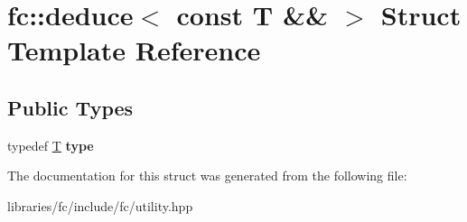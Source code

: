 \hypertarget{structfc_1_1deduce_3_01const_01_t_01_6_6_01_4}{}\section{fc\+:\+:deduce$<$ const T \&\& $>$ Struct Template Reference}
\label{structfc_1_1deduce_3_01const_01_t_01_6_6_01_4}
\subsection*{Public Types}
\begin{DoxyCompactItemize}
\item 
\mbox{\label{structfc_1_1deduce_3_01const_01_t_01_6_6_01_4_ac4671ec63ea6f569fda5b3cc44a48e73}} 
typedef \mbox{\hyperlink{struct_t}{T}} {\bfseries type}
\end{DoxyCompactItemize}


The documentation for this struct was generated from the following file\+:\begin{DoxyCompactItemize}
\item 
libraries/fc/include/fc/utility.\+hpp\end{DoxyCompactItemize}
